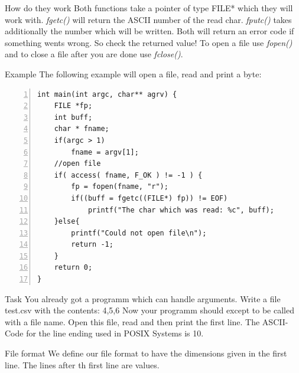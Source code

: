 \begin{frame}[fragile]{How do they work}
    Both functions take a pointer of type FILE* which they will work with. 
    \newline
    \newline
    \textit{fgetc()} will return the ASCII number of the read char.
    \newline
    \newline
    \textit{fputc()} takes additionally the number which will be written. 
    \newline
    \newline
    Both will return an error code if something wents wrong. So check the returned value!
    \newline
    \newline
    To open a file use \textit{fopen()} and to close a file after you are done use \textit{fclose()}.
\end{frame}


\begin{frame}[fragile]{Example}
    The following example will open a file, read and print a byte:
    \begin{lstlisting}[numbers=left]
int main(int argc, char** agrv) {
	FILE *fp;
	int buff;
	char * fname;
	if(argc > 1)
        fname = argv[1];
	//open file
	if( access( fname, F_OK ) != -1 ) {
        fp = fopen(fname, "r");
        if((buff = fgetc((FILE*) fp)) != EOF)
            printf("The char which was read: %c", buff);        
	}else{
        printf("Could not open file\n");
        return -1;
	}
	return 0;
}   \end{lstlisting}
\end{frame}

\begin{frame}{Task}
    You already got a programm which can handle arguments.\newline
    \newline
    Write a file test.csv with the contents: 4,5,6
    \newline
    Now your programm should except to be called with a file name. Open this file, read and then print the first line. The ASCII-Code for the line ending used in POSIX Systems is 10.
\end{frame}

\begin{frame}{File format}
    We define our file format to have the dimensions given in the first line.
    The lines after th first line are values.\newline
\end{frame}



